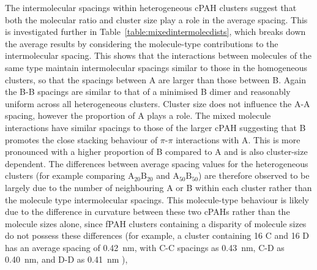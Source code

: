 The intermolecular spacings within heterogeneous cPAH clusters suggest that both the molecular ratio and cluster size play a role in the average spacing. This is investigated further in Table~\ref{table:mixedintermolecdists}, which breaks down the average results by considering the molecule-type contributions to the intermolecular spacing. This shows that the interactions between molecules of the same type maintain intermolecular spacings similar to those in the homogeneous clusters, so that the spacings between A are larger than those between B. Again the B-B spacings are similar to that of a minimised B dimer and reasonably uniform across all heterogeneous clusters.  %
Cluster size does not influence the A-A spacing, however the proportion of A plays a role. The mixed molecule interactions have similar spacings to those of the larger cPAH suggesting that B promotes the close stacking behaviour of $\pi$-$\pi$ interactions with A. This is more pronounced with a higher proportion of B compared to A and is also cluster-size dependent. The differences between average spacing values for the heterogeneous clusters (for example comparing $\text{A}_{\text{20}}\text{B}_{\text{20}}$ and $\text{A}_{\text{50}}\text{B}_{\text{50}}$) are therefore observed to be largely due to the number of neighbouring A or B within each cluster rather than the molecule type intermolecular spacings. %
This molecule-type behaviour is likely due to the difference in curvature between these two cPAHs rather than the molecule sizes alone, since fPAH clusters containing a disparity of molecule sizes do not possess these differences (for example, a cluster containing 16 C and 16 D has an average spacing of 0.42~nm, with C-C spacings as 0.43~nm, C-D as 0.40~nm, and D-D as 0.41~nm \cite{bowal2018partitioning}), 

